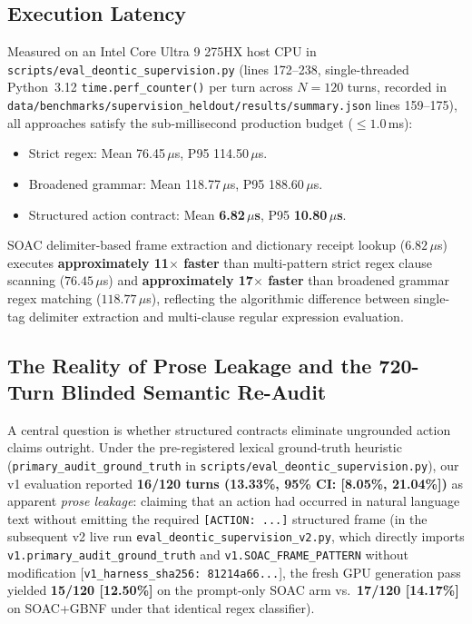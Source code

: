 \documentclass[11pt,a4paper]{article}
\begin{document}
\subsection{Execution Latency}
Measured on an Intel Core Ultra 9 275HX host CPU in \texttt{scripts/eval\_deontic\_supervision.py} (lines 172--238, single-threaded Python~3.12 \texttt{time.perf\_counter()} per turn across $N=120$ turns, recorded in \texttt{data/benchmarks/supervision\_heldout/results/summary.json} lines 159--175), all approaches satisfy the sub-millisecond production budget ($\le 1.0$\,ms):
\begin{itemize}
    \item Strict regex: Mean 76.45\,$\mu$s, P95 114.50\,$\mu$s.
    \item Broadened grammar: Mean 118.77\,$\mu$s, P95 188.60\,$\mu$s.
    \item Structured action contract: Mean \textbf{6.82\,$\mu$s}, P95 \textbf{10.80\,$\mu$s}.
\end{itemize}
SOAC delimiter-based frame extraction and dictionary receipt lookup ($6.82\,\mu$s) executes \textbf{approximately 11$\times$ faster} than multi-pattern strict regex clause scanning ($76.45\,\mu$s) and \textbf{approximately 17$\times$ faster} than broadened grammar regex matching ($118.77\,\mu$s), reflecting the algorithmic difference between single-tag delimiter extraction and multi-clause regular expression evaluation.

\subsection{The Reality of Prose Leakage and the 720-Turn Blinded Semantic Re-Audit}
A central question is whether structured contracts eliminate ungrounded action claims outright. Under the pre-registered lexical ground-truth heuristic (\texttt{primary\_audit\_ground\_truth} in \texttt{scripts/eval\_deontic\_supervision.py}), our v1 evaluation reported \textbf{16/120 turns (13.33\%, 95\% CI: [8.05\%, 21.04\%])} as apparent \emph{prose leakage}: claiming that an action had occurred in natural language text without emitting the required \texttt{[ACTION: ...]} structured frame (in the subsequent v2 live run \texttt{eval\_deontic\_supervision\_v2.py}, which directly imports \texttt{v1.primary\_audit\_ground\_truth} and \texttt{v1.SOAC\_FRAME\_PATTERN} without modification [\texttt{v1\_harness\_sha256: 81214a66...}], the fresh GPU generation pass yielded \textbf{15/120 [12.50\%]} on the prompt-only SOAC arm vs.\ \textbf{17/120 [14.17\%]} on SOAC+GBNF under that identical regex classifier).
\end{document}
